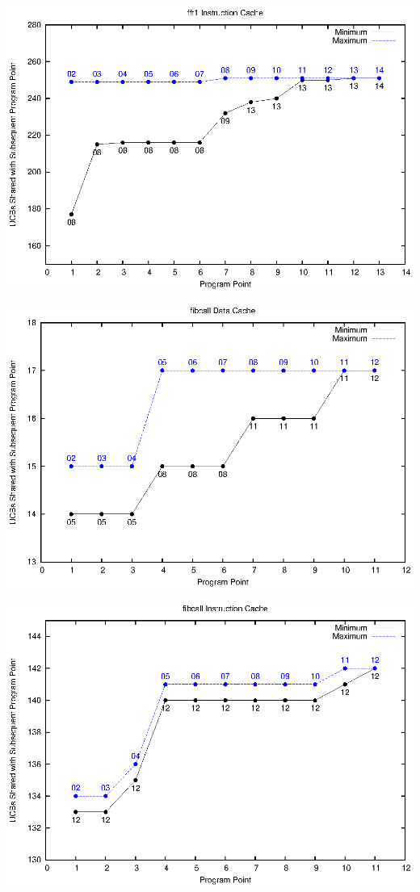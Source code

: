 \begin{center}
  \includegraphics[width=\linewidth]{eps/fft1-icache.eps}
\end{center}

\begin{center}
  \includegraphics[width=\linewidth]{eps/fibcall-dcache.eps}
\end{center}

\begin{center}
  \includegraphics[width=\linewidth]{eps/fibcall-icache.eps}
\end{center}

